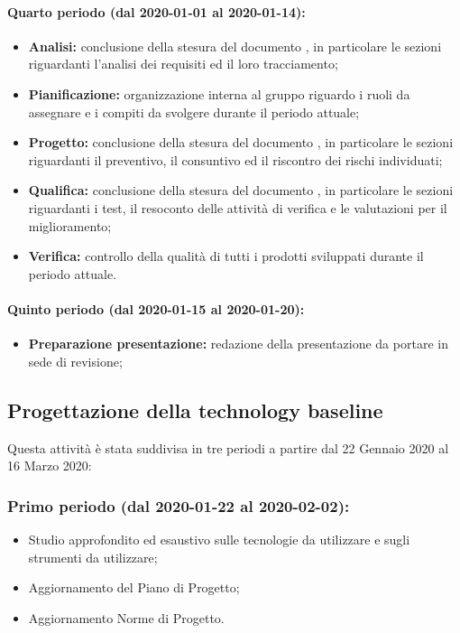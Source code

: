 			\paragraph{Quarto periodo (dal 2020-01-01 al 2020-01-14):}
				\begin{itemize}
					\item \textbf{Analisi:} conclusione della stesura del documento , in particolare le sezioni riguardanti l'analisi dei requisiti ed il loro tracciamento;
					\item \textbf{Pianificazione:} organizzazione interna al gruppo riguardo i ruoli da assegnare e i compiti da svolgere durante il periodo attuale;
					\item \textbf{Progetto:} conclusione della stesura del documento , in particolare le sezioni riguardanti il preventivo, il consuntivo ed il riscontro dei rischi individuati;
					\item \textbf{Qualifica:} conclusione della stesura del documento , in particolare le sezioni riguardanti i test, il resoconto delle attività di verifica e le valutazioni per il miglioramento;
					\item \textbf{Verifica:} controllo della qualità di tutti i prodotti sviluppati durante il periodo attuale.
				\end{itemize}
			\paragraph{Quinto periodo (dal 2020-01-15 al 2020-01-20):}
				\begin{itemize}
					\item \textbf{Preparazione presentazione:} redazione della presentazione da portare in sede di revisione;
				\end{itemize}

	\subsection{Progettazione della technology baseline}
	Questa attività è stata suddivisa in tre periodi a partire dal 22 Gennaio 2020 al 16 Marzo 2020:

		\subsubsection{Primo periodo (dal 2020-01-22 al 2020-02-02):}
			\begin{itemize}
			 	\item Studio approfondito ed esaustivo sulle tecnologie da utilizzare e sugli strumenti da utilizzare;
			 	\item Aggiornamento del Piano di Progetto;
			 	\item Aggiornamento Norme di Progetto.
			\end{itemize} 	
		
